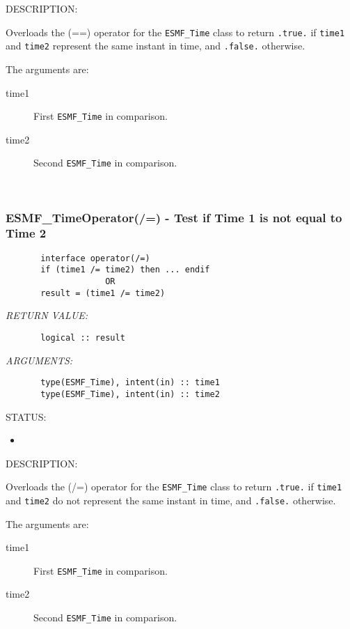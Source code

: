 {\sf DESCRIPTION:\\ }


       Overloads the (==) operator for the {\tt ESMF\_Time} class to return 
       {\tt .true.} if {\tt time1} and {\tt time2} represent the same instant 
       in time, and {\tt .false.} otherwise.
  
       The arguments are:
       \begin{description}
       \item[time1]
            First {\tt ESMF\_Time} in comparison.
       \item[time2]
            Second {\tt ESMF\_Time} in comparison.
       \end{description}
   
 
\mbox{}\hrulefill\ 
 
\subsubsection [ESMF\_TimeOperator(/=)] {ESMF\_TimeOperator(/=) - Test if Time 1 is not equal to Time 2}


  
\begin{verbatim}       interface operator(/=)
       if (time1 /= time2) then ... endif
                    OR
       result = (time1 /= time2)\end{verbatim}{\em RETURN VALUE:}
\begin{verbatim}       logical :: result\end{verbatim}{\em ARGUMENTS:}
\begin{verbatim}       type(ESMF_Time), intent(in) :: time1
       type(ESMF_Time), intent(in) :: time2\end{verbatim}
{\sf STATUS:}
   \begin{itemize}
   \item{}
   \end{itemize}
  
{\sf DESCRIPTION:\\ }


       Overloads the (/=) operator for the {\tt ESMF\_Time} class to return 
       {\tt .true.} if {\tt time1} and {\tt time2} do not represent the same 
       instant in time, and {\tt .false.} otherwise.
  
       The arguments are:
       \begin{description}
       \item[time1]
            First {\tt ESMF\_Time} in comparison.
       \item[time2]
            Second {\tt ESMF\_Time} in comparison.
       \end{description}
    
